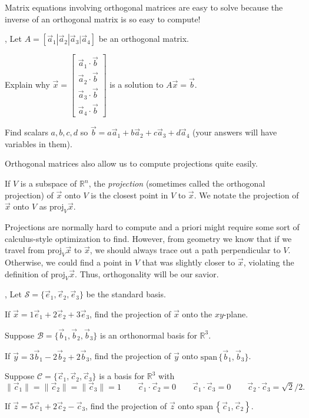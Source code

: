 \documentclass[letter]{article}
\newcommand{\R}{\mathbb{R}}
\newcommand{\proj}{\mathrm{proj}}
\renewcommand{\span}{\mathrm{span}\,}
\newcommand{\mat}[1]{\begin{bmatrix}#1\end{bmatrix}}
\begin{document}
	Matrix equations involving orthogonal matrices are easy to solve because the
	inverse of an orthogonal matrix is so easy to compute!
	
	\sep
	Let $A=[\vec a_1|\vec a_2|\vec a_3|\vec a_4]$ be an orthogonal matrix.
	\begin{Enum}
		\item Explain why 
			$\vec x=\mat{\vec a_1\cdot \vec b\\
				     \vec a_2\cdot \vec b\\
			     	     \vec a_3\cdot \vec b\\
			     	     \vec a_4\cdot \vec b}$ is a solution to $A\vec x=\vec b$.
		\item Find scalars $a,b,c,d$ so $\vec b=a\vec a_1+b\vec a_2+c\vec a_3+d\vec a_4$
			(your answers will have variables in them).
	\end{Enum}

	Orthogonal matrices also allow us to compute projections quite easily.

	\begin{Def}
		If $V$ is a subspace of $\R^n$, the \emph{projection}
		(sometimes called the orthogonal projection) of $\vec x$ onto $V$
		is the closest point in $V$ to $\vec x$. We notate the projection
		of $\vec x$ onto $V$ as $\proj_V\vec x$.
	\end{Def}

	Projections are normally hard to compute and a priori might require some sort
	of calculus-style optimization to find.  However, from geometry we know that 
	if we travel from $\proj_V \vec x$ to $\vec x$, we should always trace out a path
	perpendicular to $V$.  Otherwise, we could find a point in $V$ that was slightly closer
	to $\vec x$, violating the definition of $\proj_V \vec x$.  Thus, orthogonality
	will be our savior.

	\sep
	Let $\mathcal S=\{\vec e_1,\vec e_2,\vec e_3\}$ be the standard basis.
	\begin{Enum}
		\item If $\vec x=1\vec e_1+2\vec e_2+3\vec e_3$, find the projection of $\vec x$
			onto the $xy$-plane.
	\end{Enum}
	Suppose $\mathcal B=\{\vec b_1,\vec b_2,\vec b_3\}$ is an orthonormal basis for $\R^3$.
	\begin{Enum}[resume]
		\item If $\vec y=3\vec b_1-2\vec b_2+2\vec b_3$, find the projection of $\vec y$
			onto $\span\{\vec b_1,\vec b_3\}$.
	\end{Enum}
	Suppose $\mathcal C=\{\vec c_1,\vec c_2,\vec c_3\}$ is a basis for $\R^3$ with
	\[
		\|\vec c_1\| = 
		\|\vec c_2\| = 
		\|\vec c_3\| = 1\qquad \vec c_1\cdot \vec c_2=0\qquad \vec c_1\cdot \vec c_3=0
		\qquad \vec c_2\cdot \vec c_3=\sqrt{2}/2.
	\]
	\vspace{-.35in}
	\begin{Enum}[resume]
		\item If $\vec z=5\vec c_1+2\vec c_2-\vec c_3$, find the projection of $\vec z$
			onto $\span\left\{\vec c_1,\vec c_2\right\}$.
	\end{Enum}
\end{document}

